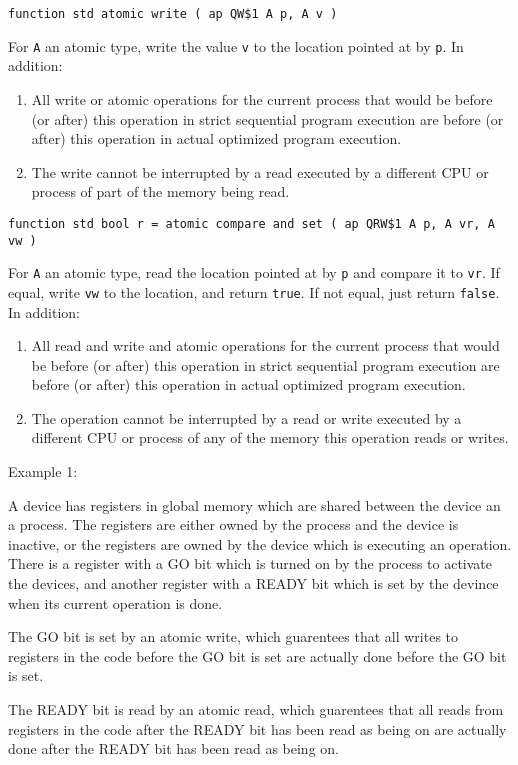 \documentclass[12pt]{article}
\newenvironment{indpar}[1][0.3in]%
	{\begin{list}{}%
		     {\setlength{\itemsep}{0in}%
		      \setlength{\topsep}{0in}%
		      \setlength{\parsep}{1ex}%
		      \setlength{\labelwidth}{#1}%
		      \setlength{\leftmargin}{#1}%
		      \addtolength{\leftmargin}{\labelsep}}%
	 \item}%
	{\end{list}}
\begin{document}
{\tt function std atomic write ( ap QW\$1 A p, A v )}
\begin{indpar}
For {\tt A} an atomic type,
write the value {\tt v} to the location pointed at by {\tt p}.
In addition:
\begin{enumerate}
\item
All write or atomic operations for the current process that would be
before (or after) this operation in strict sequential program execution
are before (or after) this operation in actual optimized program execution.
\item
The write cannot be interrupted by a read executed by a different CPU
or process of part of the memory being read.
\end{enumerate}
\end{indpar}

{\tt function std bool r =
	atomic compare and set ( ap QRW\$1 A p, A vr, A vw )}
\begin{indpar}
For {\tt A} an atomic type,
read the location pointed at by {\tt p} and compare it to {\tt vr}.
If equal, write {\tt vw} to the location, and return {\tt true}.
If not equal, just return {\tt false}.
In addition:
\begin{enumerate}
\item
All read and write and atomic operations for the current process that would be
before (or after) this operation in strict sequential program execution
are before (or after) this operation in actual optimized program execution.
\item
The operation cannot be interrupted by a read or write
executed by a different CPU or process of any of the memory this operation
reads or writes.
\end{enumerate}
\end{indpar}

Example 1:
\begin{indpar}
A device has registers in global memory which are shared between the
device an a process.  The registers are either owned by the process
and the device is inactive, or the registers are owned by the device
which is executing an operation.  There is a register with a GO bit
which is turned on by the process to activate the devices, and another
register with a READY bit which is set by the devince when its current
operation is done.

The GO bit is set by an atomic write, which guarentees that all writes
to registers in the code before the GO bit is set are actually done
before the GO bit is set.

The READY bit is read by an atomic read, which guarentees that all reads
from registers in the code after the READY bit has been read as being on 
are actually done after the READY bit has been read as being on.
\end{indpar}
\end{document}
